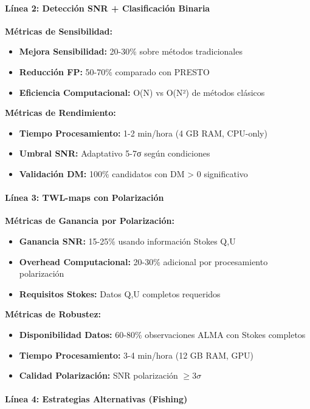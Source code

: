 \paragraph{Línea 2: Detección SNR + Clasificación Binaria}

\textbf{Métricas de Sensibilidad:}
\begin{itemize}
\item \textbf{Mejora Sensibilidad:} 20-30\% sobre métodos tradicionales
\item \textbf{Reducción FP:} 50-70\% comparado con PRESTO
\item \textbf{Eficiencia Computacional:} O(N) vs O(N²) de métodos clásicos
\end{itemize}

\textbf{Métricas de Rendimiento:}
\begin{itemize}
\item \textbf{Tiempo Procesamiento:} 1-2 min/hora (4 GB RAM, CPU-only)
\item \textbf{Umbral SNR:} Adaptativo 5-7σ según condiciones
\item \textbf{Validación DM:} 100\% candidatos con DM > 0 significativo
\end{itemize}

\paragraph{Línea 3: TWL-maps con Polarización}

\textbf{Métricas de Ganancia por Polarización:}
\begin{itemize}
\item \textbf{Ganancia SNR:} 15-25\% usando información Stokes Q,U
\item \textbf{Overhead Computacional:} 20-30\% adicional por procesamiento polarización
\item \textbf{Requisitos Stokes:} Datos Q,U completos requeridos
\end{itemize}

\textbf{Métricas de Robustez:}
\begin{itemize}
\item \textbf{Disponibilidad Datos:} 60-80\% observaciones ALMA con Stokes completos
\item \textbf{Tiempo Procesamiento:} 3-4 min/hora (12 GB RAM, GPU)
\item \textbf{Calidad Polarización:} SNR polarización $\geq 3\sigma$
\end{itemize}

\paragraph{Línea 4: Estrategias Alternativas (Fishing)}


